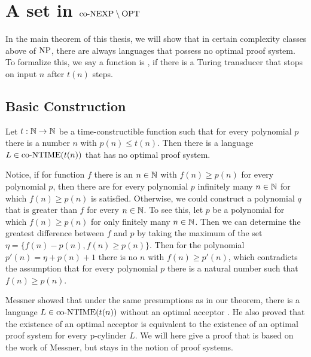 \chapter{A set in $\text{co-NEXP} \setminus \text{OPT}$} \label{chpConexpMinusOpt}
  In the main theorem of this thesis, we will show that in certain complexity classes above of \(\text{NP}\), there are always languages that possess no optimal proof system. To formalize this, we say a function is , if there is a Turing transducer that stops on input \(n\) after \(t(n)\) steps.

  \section{Basic Construction}
  
  \begin{theorem}\label{thmMain}
    Let \(t : \mathbb{N} \to \mathbb{N}\) be a time-constructible function such that for every polynomial \(p\) there is a number \(n\) with \(p(n) \leq t(n)\). Then there is a language \(L \in \text{co-NTIME}(t(n))\) that has no optimal proof system.
  \end{theorem}

  Notice, if for function \(f\) there is an \(n \in \mathbb{N}\) with \(f(n) \geq p(n)\) for every polynomial \(p\), then there are for every polynomial \(p\) infinitely many \(n \in \mathbb{N}\) for which \(f(n) \geq p(n)\) is satisfied. Otherwise, we could construct a polynomial \(q\) that is greater than \(f\) for every \(n \in \mathbb{N}\). To see this, let \(p\) be a polynomial for which \(f(n) \geq p(n)\) for only finitely many \(n \in \mathbb{N}\). Then we can determine the greatest difference between \(f\) and \(p\) by taking the maximum of the set \(\eta = \{ f(n) - p(n), f(n) \geq p(n) \}\). Then for the polynomial \(p'(n) = \eta + p(n) + 1\) there is no \(n\) with \(f(n) \geq p'(n)\), which contradicts the assumption that for every polynomial \(p\) there is a natural number such that \(f(n) \geq p(n)\).

  Messner showed that under the same presumptions as in our theorem, there is a language \(L \in \text{co-NTIME}(t(n))\) without an optimal acceptor \cite{Mes99}. He also proved that the existence of an optimal acceptor is equivalent to the existence of an optimal proof system for every p-cylinder \(L\). We will here give a proof that is based on the work of Messner, but stays in the notion of proof systems.

